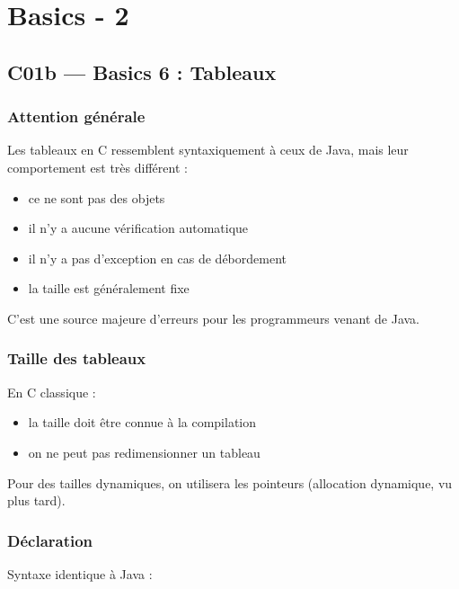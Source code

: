 
\chapter{Basics - 2}%
\label{cha:Basics - 2}

\section{C01b — Basics 6 : Tableaux}

\subsection{Attention générale}

Les tableaux en C ressemblent syntaxiquement à ceux de Java,  
mais leur comportement est très différent :

\begin{itemize}
    \item ce ne sont pas des objets
    \item il n’y a aucune vérification automatique
    \item il n’y a pas d’exception en cas de débordement
    \item la taille est généralement fixe
\end{itemize}

C’est une source majeure d’erreurs pour les programmeurs venant de Java.

\subsection{Taille des tableaux}

En C classique :

\begin{itemize}
    \item la taille doit être connue à la compilation
    \item on ne peut pas redimensionner un tableau
\end{itemize}

Pour des tailles dynamiques, on utilisera les pointeurs
(allocation dynamique, vu plus tard).

\subsection{Déclaration}

Syntaxe identique à Java :

